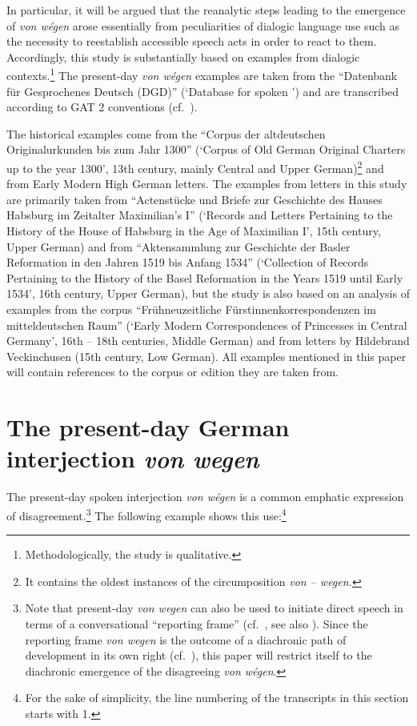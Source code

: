 \documentclass[output=paper
  ,nobabel
  ,draftmode
  ,babelshorthands
  ,colorlinks, citecolor=brown
]{langscibook}
\begin{document}
In particular, it will be argued that the reanalytic steps leading to the emergence of \emph{von wégen} arose essentially from peculiarities of dialogic language use such as the necessity to reestablish accessible speech acts in order to react to them. Accordingly, this study is substantially based on examples from dialogic contexts.\footnote{Methodologically, the study is qualitative.} The present-day \emph{von wégen} examples are taken from the ``Datenbank für Gesprochenes Deutsch (DGD)'' (`Database for spoken ') and are transcribed according to GAT 2 conventions (cf.\ \citealp{Selting2009}).

The historical examples come from the ``Corpus der altdeutschen Originalur\-kunden bis zum Jahr 1300''
(`Corpus of Old German Original Charters up to the year 1300', 13th century, mainly
Central and Upper German)\footnote{It contains the  oldest
  instances of the circumposition \emph{von -- wegen.}}  and from Early Modern High
German letters. The examples from letters in this study are primarily
taken from ``Actenstücke und Briefe zur Geschichte des Hauses Habsburg im Zeitalter Maximilian’s I''
(`Records and Letters Pertaining to the History of the House of Habsburg in the Age of
Maximilian I', 15th century, Upper German) and from ``Aktensammlung zur Geschichte
der Basler Reformation in den Jahren 1519 bis Anfang 1534'' (`Collection of Records Pertaining to the
History of the Basel Reformation in the Years 1519 until Early 1534', 16th century, Upper
German), but the study is also based on an analysis of examples from the corpus
``Frühneuzeitliche Fürstinnenkorrespondenzen im mitteldeutschen Raum'' (`Early Modern Correspondences
of Princesses in Central Germany', 16th -- 18th centuries, Middle German) and from letters by Hildebrand Veckinchusen (15th century, Low German). All examples mentioned in this paper will contain references to the corpus or edition they are taken from.

\section{The present-day German interjection \emph{von wegen}}\label{sec-pres-vw}

The present-day spoken  interjection \emph{von wégen} is a common emphatic expression of
disagreement.\footnote{Note that present-day  \emph{von wegen} can also be used to initiate
  direct speech in terms of a conversational ``reporting frame'' (cf.\ \citealp{Buecker2009,
    Buecker2013}, see also \citealp[307–310]{Androutsopoulos1998}). Since the reporting frame \emph{von wegen} is the outcome of a diachronic path of development in its own right (cf.\ \citealt{Buecker2022a}), this paper will restrict itself to the diachronic emergence of the disagreeing \emph{von wégen}.} The following example shows this use:\footnote{For the sake of simplicity, the line numbering of the transcripts in this section starts with 1.}
\end{document}
